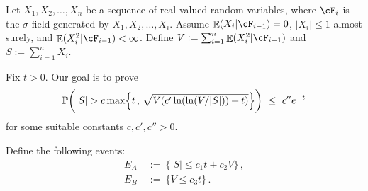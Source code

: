 \documentclass[11pt]{article}
\DeclareMathOperator{\E}{\mathbb{E}}
\renewcommand{\P}{\ensuremath{\mathbb{P}}}
\theoremstyle{remark}
\theoremstyle{definition}
\newcommand\braces[1]{\{#1\}}
\renewcommand\abs[1]{|#1|} %
\newcommand\Parens[1]{\mleft(#1\mright)}
\newcommand\Braces[1]{\mleft\{#1\mright\}}
\begin{document}
Let $X_1, X_2, \dotsc, X_n$ be a sequence of real-valued random
variables, where $\cF_i$ is the $\sigma$-field generated by $X_1, X_2,
\dotsc, X_i$.
Assume $\E(X_i|\cF_{i-1}) = 0$, $\abs{X_i} \leq 1$ almost surely, and
$\E(X_i^2|\cF_{i-1}) < \infty$.
Define $V := \sum_{i=1}^n \E(X_i^2|\cF_{i-1})$ and $S := \sum_{i=1}^n
X_i$.

Fix $t>0$.
Our goal is to prove
\[
  \P\Parens{
    |S| > c \max\Braces{ t \,,\, \sqrt{V (c' \ln(\ln(V/|S|)) + t)} }
  }
  \ \leq \ c'' e^{-t}
\]
for some suitable constants $c, c', c'' > 0$.

Define the following events:
\begin{align*}
  E_A & \ := \ \braces{ |S| \leq c_1 t + c_2 V }
  \,, \\
  E_B & \ := \ \braces{ V \leq c_3 t }
  \,.
\end{align*}
\end{document}
